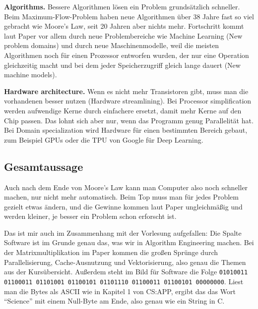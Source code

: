 \documentclass[11pt]{article}
\begin{document}
\textbf{Algorithms.} Bessere Algorithmen lösen ein Problem grundsätzlich schneller. Beim
Maximum-Flow-Problem haben neue Algorithmen über 38 Jahre fast so viel gebracht wie Moore's Law,
seit 20 Jahren aber nichts mehr. Fortschritt kommt laut Paper vor allem durch neue Problembereiche
wie Machine Learning (New problem domains) und durch neue Maschinenmodelle, weil die meisten
Algorithmen noch für einen Prozessor entworfen wurden, der nur eine Operation gleichzeitig macht und
bei dem jeder Speicherzugriff gleich lange dauert (New machine models).

\textbf{Hardware architecture.} Wenn es nicht mehr Transistoren gibt, muss man die vorhandenen
besser nutzen (Hardware streamlining). Bei Processor simplification werden aufwendige Kerne durch
einfachere ersetzt, damit mehr Kerne auf den Chip passen. Das lohnt sich aber nur, wenn das
Programm genug Parallelität hat. Bei Domain specialization wird Hardware für einen bestimmten
Bereich gebaut, zum Beispiel GPUs oder die TPU von Google für Deep Learning.

\subsection*{Gesamtaussage}

Auch nach dem Ende von Moore's Law kann man Computer also noch schneller machen, nur nicht mehr
automatisch. Beim Top muss man für jedes Problem gezielt etwas ändern, und die Gewinne kommen laut
Paper ungleichmäßig und werden kleiner, je besser ein Problem schon erforscht ist.

Das ist mir auch im Zusammenhang mit der Vorlesung aufgefallen: Die Spalte Software ist im Grunde
genau das, was wir in Algorithm Engineering machen. Bei der Matrixmultiplikation im Paper kommen
die großen Sprünge durch Parallelisierung, Cache-Ausnutzung und Vektorisierung, also genau die
Themen aus der Kursübersicht. Außerdem steht im Bild für Software die Folge
\texttt{01010011 01100011 01101001 01100101 01101110 01100011 01100101 00000000}. Liest man die
Bytes als ASCII wie in Kapitel 1 von CS:APP, ergibt das das Wort "`Science"' mit einem Null-Byte
am Ende, also genau wie ein String in C.
\end{document}
